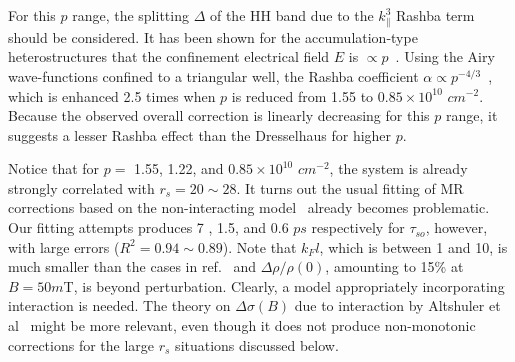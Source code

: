 \documentclass[twocolumn,secnumarabic,amssymb, nobibnotes, aps, prd]{revtex4-1}
\begin{document}
For this $p$ range, the splitting $\Delta$ of the HH band due to the $k_{\parallel}^3$ Rashba term should be considered. It has been shown for the accumulation-type heterostructures that the confinement electrical field $E$ is $\propto p$~\cite{stern}. Using the Airy wave-functions confined to a triangular well, the Rashba coefficient $\alpha\propto p^{-4/3}$~\cite{winkler}, which is enhanced 2.5 times when $p$ is reduced from 1.55 to $0.85\times10^{10}$ $cm^{-2}$. Because the observed overall correction is linearly decreasing for this $p$ range, it suggests a lesser Rashba effect than the Dresselhaus for higher $p$.  

Notice that for $p=$ 1.55, 1.22, and $0.85\times10^{10}$ $cm^{-2}$, the system is already strongly correlated with $r_s= 20\sim28$. It turns out the usual fitting of MR corrections based on the non-interacting model~\cite{HLN} already becomes problematic. Our fitting attempts produces 7 , 1.5, and 0.6 $ps$ respectively for $\tau_{so}$, however, with large errors ($R^2=0.94\sim0.89$). Note that $k_F l$, which is between 1 and 10, is much smaller than the cases in ref.~\cite{SOI2} and $\Delta\rho/\rho(0)$, amounting to 15\% at $B=50 m$T, is beyond perturbation. Clearly, a model appropriately incorporating interaction is needed. The theory on $\Delta\sigma(B)$ due to interaction by Altshuler et al~\cite{Altshuler} might be more relevant, even though it does not produce non-monotonic corrections for the large $r_s$ situations discussed below.
\end{document}
